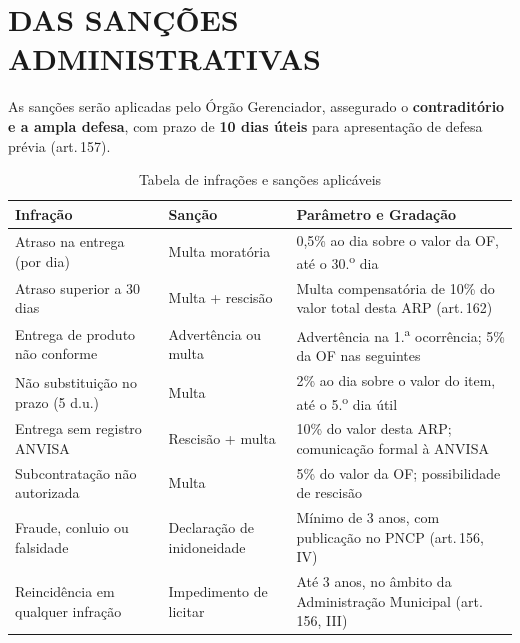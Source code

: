 \documentclass[12pt,a4paper]{article}
\newcommand{\art}[1]{art.\,#1}
\begin{document}
\section{DAS SANÇÕES ADMINISTRATIVAS}
\label{sec:sancoes}

\begin{legalbox}
\small
As sanções serão aplicadas pelo Órgão Gerenciador, assegurado o \textbf{contraditório
e a ampla defesa}, com prazo de \textbf{10 dias úteis} para apresentação de defesa
prévia (\art{157}).
\end{legalbox}

\begin{table}[H]\centering
\caption{Tabela de infrações e sanções aplicáveis}
\small{}
\begin{tabular}{L{4.5cm} C{2.0cm} L{7.0cm}}
  \color{white}\textbf{Infração} &
  \color{white}\textbf{Sanção} &
  \color{white}\textbf{Parâmetro e Gradação} \\
  \toprule
  Atraso na entrega (por dia) &
    Multa moratória &
    0,5\% ao dia sobre o valor da OF, até o 30.\textsuperscript{o} dia \\
  Atraso superior a 30 dias &
    Multa + rescisão &
    Multa compensatória de 10\% do valor total desta ARP (\art{162}) \\
  Entrega de produto não conforme &
    Advertência ou multa &
    Advertência na 1.\textsuperscript{a} ocorrência; 5\% da OF nas seguintes \\
  Não substituição no prazo (5 d.u.) &
    Multa &
    2\% ao dia sobre o valor do item, até o 5.\textsuperscript{o} dia útil \\
  Entrega sem registro ANVISA &
    Rescisão + multa &
    10\% do valor desta ARP; comunicação formal à ANVISA \\
  Subcontratação não autorizada &
    Multa &
    5\% do valor da OF; possibilidade de rescisão \\
  Fraude, conluio ou falsidade &
    Declaração de inidoneidade &
    Mínimo de 3 anos, com publicação no PNCP (\art{156}, IV) \\
  Reincidência em qualquer infração &
    Impedimento de licitar &
    Até 3 anos, no âmbito da Administração Municipal (\art{156}, III) \\
  \bottomrule
\end{tabular}
\end{table}
\end{document}

